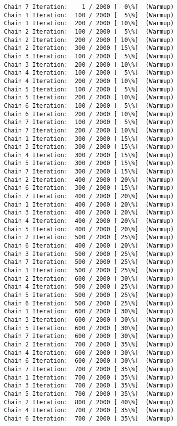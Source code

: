 \documentclass[11pt]{article}
\begin{document}
    \begin{Verbatim}[commandchars=\\\{\}]
Chain 7 Iteration:    1 / 2000 [  0\%]  (Warmup)
Chain 1 Iteration:  100 / 2000 [  5\%]  (Warmup)
Chain 1 Iteration:  200 / 2000 [ 10\%]  (Warmup)
Chain 2 Iteration:  100 / 2000 [  5\%]  (Warmup)
Chain 2 Iteration:  200 / 2000 [ 10\%]  (Warmup)
Chain 2 Iteration:  300 / 2000 [ 15\%]  (Warmup)
Chain 3 Iteration:  100 / 2000 [  5\%]  (Warmup)
Chain 3 Iteration:  200 / 2000 [ 10\%]  (Warmup)
Chain 4 Iteration:  100 / 2000 [  5\%]  (Warmup)
Chain 4 Iteration:  200 / 2000 [ 10\%]  (Warmup)
Chain 5 Iteration:  100 / 2000 [  5\%]  (Warmup)
Chain 5 Iteration:  200 / 2000 [ 10\%]  (Warmup)
Chain 6 Iteration:  100 / 2000 [  5\%]  (Warmup)
Chain 6 Iteration:  200 / 2000 [ 10\%]  (Warmup)
Chain 7 Iteration:  100 / 2000 [  5\%]  (Warmup)
Chain 7 Iteration:  200 / 2000 [ 10\%]  (Warmup)
Chain 1 Iteration:  300 / 2000 [ 15\%]  (Warmup)
Chain 3 Iteration:  300 / 2000 [ 15\%]  (Warmup)
Chain 4 Iteration:  300 / 2000 [ 15\%]  (Warmup)
Chain 5 Iteration:  300 / 2000 [ 15\%]  (Warmup)
Chain 7 Iteration:  300 / 2000 [ 15\%]  (Warmup)
Chain 2 Iteration:  400 / 2000 [ 20\%]  (Warmup)
Chain 6 Iteration:  300 / 2000 [ 15\%]  (Warmup)
Chain 7 Iteration:  400 / 2000 [ 20\%]  (Warmup)
Chain 1 Iteration:  400 / 2000 [ 20\%]  (Warmup)
Chain 3 Iteration:  400 / 2000 [ 20\%]  (Warmup)
Chain 4 Iteration:  400 / 2000 [ 20\%]  (Warmup)
Chain 5 Iteration:  400 / 2000 [ 20\%]  (Warmup)
Chain 2 Iteration:  500 / 2000 [ 25\%]  (Warmup)
Chain 6 Iteration:  400 / 2000 [ 20\%]  (Warmup)
Chain 3 Iteration:  500 / 2000 [ 25\%]  (Warmup)
Chain 7 Iteration:  500 / 2000 [ 25\%]  (Warmup)
Chain 1 Iteration:  500 / 2000 [ 25\%]  (Warmup)
Chain 2 Iteration:  600 / 2000 [ 30\%]  (Warmup)
Chain 4 Iteration:  500 / 2000 [ 25\%]  (Warmup)
Chain 5 Iteration:  500 / 2000 [ 25\%]  (Warmup)
Chain 6 Iteration:  500 / 2000 [ 25\%]  (Warmup)
Chain 1 Iteration:  600 / 2000 [ 30\%]  (Warmup)
Chain 3 Iteration:  600 / 2000 [ 30\%]  (Warmup)
Chain 5 Iteration:  600 / 2000 [ 30\%]  (Warmup)
Chain 7 Iteration:  600 / 2000 [ 30\%]  (Warmup)
Chain 2 Iteration:  700 / 2000 [ 35\%]  (Warmup)
Chain 4 Iteration:  600 / 2000 [ 30\%]  (Warmup)
Chain 6 Iteration:  600 / 2000 [ 30\%]  (Warmup)
Chain 7 Iteration:  700 / 2000 [ 35\%]  (Warmup)
Chain 1 Iteration:  700 / 2000 [ 35\%]  (Warmup)
Chain 3 Iteration:  700 / 2000 [ 35\%]  (Warmup)
Chain 5 Iteration:  700 / 2000 [ 35\%]  (Warmup)
Chain 2 Iteration:  800 / 2000 [ 40\%]  (Warmup)
Chain 4 Iteration:  700 / 2000 [ 35\%]  (Warmup)
Chain 6 Iteration:  700 / 2000 [ 35\%]  (Warmup)

\end{Verbatim}
\end{document}
